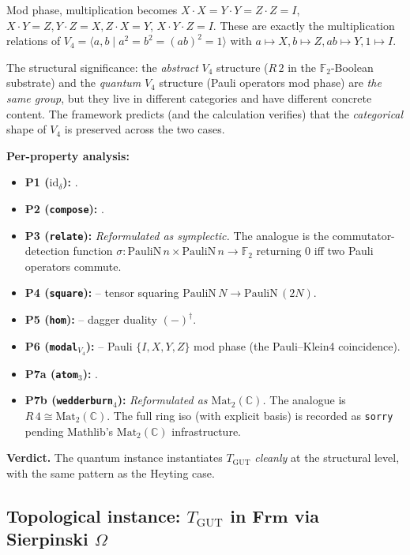 \documentclass[11pt,a4paper]{article}
\theoremstyle{plain}
\theoremstyle{definition}
\theoremstyle{remark}
\newcommand{\F}{\mathbb{F}}
\newcommand{\C}{\mathbb{C}}
\newcommand{\cat}[1]{\mathbf{#1}}
\newcommand{\Frm}{\cat{Frm}}
\newcommand{\Mat}{\mathrm{Mat}}
\newcommand{\id}{\mathrm{id}}
\newcommand{\TGUT}{T_{\mathrm{GUT}}}
\newcommand{\PauliN}{\mathrm{PauliN}}
\begin{document}
Mod phase, multiplication becomes $X \cdot X = Y \cdot Y = Z \cdot Z = I$, $X \cdot Y = Z, Y \cdot Z = X, Z \cdot X = Y$, $X \cdot Y \cdot Z = I$. These are exactly the multiplication relations of $V_4 = \langle a, b \mid a^2 = b^2 = (ab)^2 = 1 \rangle$ with $a \mapsto X, b \mapsto Z, ab \mapsto Y, 1 \mapsto I$.

The structural significance: the \emph{abstract} $V_4$ structure ($R\,2$ in the $\F_2$-Boolean substrate) and the \emph{quantum} $V_4$ structure (Pauli operators mod phase) are \emph{the same group}, but they live in different categories and have different concrete content. The framework predicts (and the calculation verifies) that the \emph{categorical} shape of $V_4$ is preserved across the two cases.

\textbf{Per-property analysis:}

\begin{itemize}[leftmargin=*]
\item \textbf{P1 ($\id_\delta$):} \checkmark{}.
\item \textbf{P2 (\texttt{compose}):} \checkmark{}.
\item \textbf{P3 (\texttt{relate}):} \emph{Reformulated as symplectic.} The analogue is the commutator-detection function $\sigma : \PauliN\,n \times \PauliN\,n \to \F_2$ returning 0 iff two Pauli operators commute.
\item \textbf{P4 (\texttt{square}):} \checkmark{} -- tensor squaring $\PauliN\,N \to \PauliN\,(2N)$.
\item \textbf{P5 (\texttt{hom}):} \checkmark{} -- dagger duality $(-)^\dagger$.
\item \textbf{P6 (\texttt{modal}$_{V_4}$):} \checkmark{} -- Pauli $\{I, X, Y, Z\}$ mod phase (the Pauli--Klein4 coincidence).
\item \textbf{P7a (\texttt{atom}$_3$):} \checkmark{}.
\item \textbf{P7b (\texttt{wedderburn}$_4$):} \emph{Reformulated as $\Mat_2(\C)$.} The analogue is $R\,4 \cong \Mat_2(\C)$. The full ring iso (with explicit basis) is recorded as \texttt{sorry} pending Mathlib's $\Mat_2(\C)$ infrastructure.
\end{itemize}

\textbf{Verdict.} The quantum instance instantiates $\TGUT$ \emph{cleanly} at the structural level, with the same pattern as the Heyting case.

\subsection{Topological instance: $\TGUT$ in $\Frm$ via Sierpinski $\Omega$}\label{sec:inst:topological}
\end{document}
